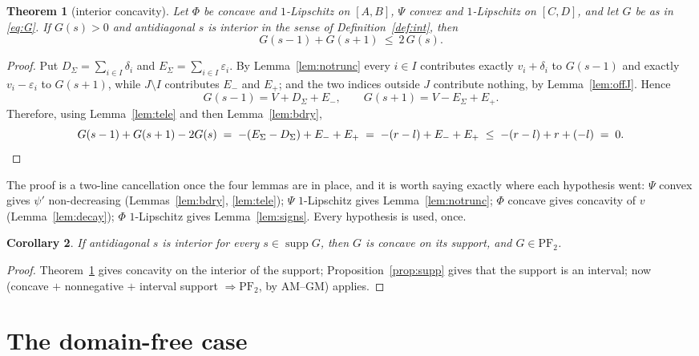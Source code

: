 \documentclass[11pt]{article}
\newtheorem{theorem}{Theorem}
\newtheorem{corollary}[theorem]{Corollary}
\theoremstyle{definition}
\DeclareMathOperator{\supp}{supp}
\newcommand{\PFtwo}{\mathrm{PF}_2}
\begin{document}
\begin{theorem}[interior concavity]\label{thm:main}
Let $\Phi$ be concave and $1$-Lipschitz on $[A,B]$, $\Psi$ convex and $1$-Lipschitz on
$[C,D]$, and let $G$ be as in \eqref{eq:G}. If $G(s)>0$ and antidiagonal $s$ is interior
in the sense of Definition~\ref{def:int}, then
\[
  G(s-1)+G(s+1)\ \le\ 2\,G(s).
\]
\end{theorem}
\begin{proof}
Put $D_\Sigma=\sum_{i\in I}\delta_i$ and $E_\Sigma=\sum_{i\in I}\varepsilon_i$. By
Lemma~\ref{lem:notrunc} every $i\in I$ contributes exactly $v_i+\delta_i$ to $G(s-1)$ and
exactly $v_i-\varepsilon_i$ to $G(s+1)$, while $J\setminus I$ contributes $E_-$ and
$E_+$; and the two indices outside $J$ contribute nothing, by Lemma~\ref{lem:offJ}. Hence
\[
  G(s-1)=V+D_\Sigma+E_-,\qquad G(s+1)=V-E_\Sigma+E_+ .
\]
Therefore, using Lemma~\ref{lem:tele} and then Lemma~\ref{lem:bdry},
\[
  G(s-1)+G(s+1)-2G(s)
  \;=\;-(E_\Sigma-D_\Sigma)+E_-+E_+
  \;=\;-(r-l)+E_-+E_+
  \;\le\;-(r-l)+r+(-l)\;=\;0. \qedhere
\]
\end{proof}

The proof is a two-line cancellation once the four lemmas are in place, and it is worth
saying exactly where each hypothesis went: $\Psi$ convex gives $\psi'$ non-decreasing
(Lemmas~\ref{lem:bdry}, \ref{lem:tele}); $\Psi$ $1$-Lipschitz gives
Lemma~\ref{lem:notrunc}; $\Phi$ concave gives concavity of $v$ (Lemma~\ref{lem:decay});
$\Phi$ $1$-Lipschitz gives Lemma~\ref{lem:signs}. Every hypothesis is used, once.

\begin{corollary}\label{cor:allint}
If antidiagonal $s$ is interior for every $s\in\supp G$, then $G$ is concave on its
support, and $G\in\PFtwo$.
\end{corollary}
\begin{proof}
Theorem~\ref{thm:main} gives concavity on the interior of the support;
Proposition~\ref{prop:supp} gives that the support is an interval; now
\cite[Lem.~2.1]{c1} (concave $+$ nonnegative $+$ interval support $\Rightarrow\PFtwo$,
by AM--GM) applies.
\end{proof}

\section{The domain-free case}
\end{document}
